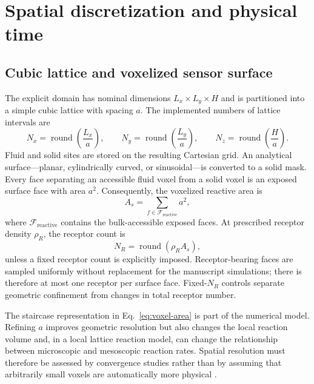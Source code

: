 \section{Spatial discretization and physical time}
\label{sec:grid}

\subsection{Cubic lattice and voxelized sensor surface}

The explicit domain has nominal dimensions $L_x\times L_y\times H$ and is
partitioned into a simple cubic lattice with spacing $a$.  The implemented
numbers of lattice intervals are
\begin{equation}
 N_x=\operatorname{round}\!\left(\frac{L_x}{a}\right),\qquad
 N_y=\operatorname{round}\!\left(\frac{L_y}{a}\right),\qquad
 N_z=\operatorname{round}\!\left(\frac{H}{a}\right).
 \label{eq:grid-counts}
\end{equation}
Fluid and solid sites are stored on the resulting Cartesian grid.  An
analytical surface---planar, cylindrically curved, or sinusoidal---is converted
to a solid mask.  Every face separating an accessible fluid voxel from a
solid voxel is an exposed surface face with area $a^2$.  Consequently, the
voxelized reactive area is
\begin{equation}
 A_s=\sum_{f\in\mathcal F_{\mathrm{reactive}}}a^2,
 \label{eq:voxel-area}
\end{equation}
where $\mathcal F_{\mathrm{reactive}}$ contains the bulk-accessible exposed
faces.  At prescribed receptor density $\rho_R$, the receptor count is
\begin{equation}
 N_R=\operatorname{round}(\rho_R A_s),
 \label{eq:receptor-count}
\end{equation}
unless a fixed receptor count is explicitly imposed.  Receptor-bearing faces
are sampled uniformly without replacement for the manuscript simulations;
there is therefore at most one receptor per surface face.  Fixed-$N_R$
controls separate geometric confinement from changes in total receptor
number.

The staircase representation in Eq.~\ref{eq:voxel-area} is part of the
numerical model.  Refining $a$ improves geometric resolution but also changes
the local reaction volume and, in a local lattice reaction model, can change
the relationship between microscopic and mesoscopic reaction rates.  Spatial
resolution must therefore be assessed by convergence studies rather than by
assuming that arbitrarily small voxels are automatically more physical
\citep{isaacson2008,hellander2012,hellander2015}.

